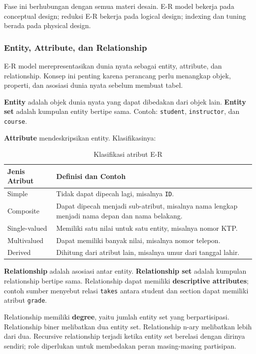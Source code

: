 Fase ini berhubungan dengan semua materi desain. E-R model bekerja pada conceptual design; reduksi E-R bekerja pada logical design; indexing dan tuning berada pada physical design.

\subsubsection{Entity, Attribute, dan Relationship}

\begin{jawab}
E-R model merepresentasikan dunia nyata sebagai entity, attribute, dan relationship. Konsep ini penting karena perancang perlu menangkap objek, properti, dan asosiasi dunia nyata sebelum membuat tabel.
\end{jawab}

\textbf{Entity} adalah objek dunia nyata yang dapat dibedakan dari objek lain. \textbf{Entity set} adalah kumpulan entity bertipe sama. Contoh: \texttt{student}, \texttt{instructor}, dan \texttt{course}.

\textbf{Attribute} mendeskripsikan entity. Klasifikasinya:
\begin{table}[H]
\centering
\begin{tabularx}{\textwidth}{|L{0.28\textwidth}|X|}
\hline
\textbf{Jenis Atribut} & \textbf{Definisi dan Contoh} \\
\hline
Simple & Tidak dapat dipecah lagi, misalnya \texttt{ID}. \\
\hline
Composite & Dapat dipecah menjadi sub-atribut, misalnya nama lengkap menjadi nama depan dan nama belakang. \\
\hline
Single-valued & Memiliki satu nilai untuk satu entity, misalnya nomor KTP. \\
\hline
Multivalued & Dapat memiliki banyak nilai, misalnya nomor telepon. \\
\hline
Derived & Dihitung dari atribut lain, misalnya umur dari tanggal lahir. \\
\hline
\end{tabularx}
\caption{Klasifikasi atribut E-R}
\label{tab:er-attribute-types}
\end{table}

\textbf{Relationship} adalah asosiasi antar entity. \textbf{Relationship set} adalah kumpulan relationship bertipe sama. Relationship dapat memiliki \textbf{descriptive attributes}; contoh sumber menyebut relasi \texttt{takes} antara student dan section dapat memiliki atribut \texttt{grade}.

Relationship memiliki \textbf{degree}, yaitu jumlah entity set yang berpartisipasi. Relationship biner melibatkan dua entity set. Relationship n-ary melibatkan lebih dari dua. Recursive relationship terjadi ketika entity set berelasi dengan dirinya sendiri; role diperlukan untuk membedakan peran masing-masing partisipan.

